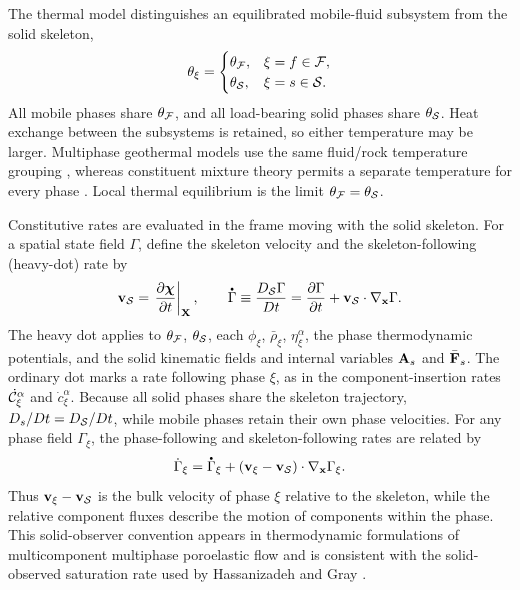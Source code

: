 The thermal model distinguishes an equilibrated mobile-fluid subsystem from
the solid skeleton,
%
\begin{equation}
	\theta_\xi
	=
	\begin{cases}
		\theta_{\mathcal{F}}, & \xi=f\in\mathcal{F},  \\
		\theta_{\mathcal{S}}, & \xi=s\in\mathcal{S} .
	\end{cases}
	\label{eq:MC_two_temperature_specialization}
\end{equation}
%
All mobile phases share \(\theta_{\mathcal{F}}\), and all load-bearing solid phases
share \(\theta_{\mathcal{S}}\).  Heat exchange between the subsystems is retained,
so either temperature may be larger.  Multiphase geothermal models use the
same fluid/rock temperature grouping \cite{faraz2021boiling}, whereas
constituent mixture theory permits a separate temperature for every phase
\cite{drumheller2000,hanyga2004thermal}.  Local thermal equilibrium is the
limit \(\theta_{\mathcal{F}}=\theta_{\mathcal{S}}\).

Constitutive rates are evaluated in the frame moving with the solid skeleton.
For a spatial state field \(\Gamma\), define the skeleton velocity and the
skeleton-following (heavy-dot) rate by
%
\begin{equation}
	\mbf v_{\mc S}
	=
	\left.
	\frac{\partial\bs\chi}{\partial t}
	\right\vert_{\mbf X},
	\qquad
	\phasedot\Gamma
	\equiv
	\frac{D_{\mc S}\Gamma}{Dt}
	=
	\frac{\partial\Gamma}{\partial t}
	+
	\mbf v_{\mc S}\cdot\nabla_{\mbf x}\Gamma .
	\label{eq:MC_skeleton_rate_convention}
\end{equation}
%
The heavy dot applies to \(\theta_{\mathcal{F}}\), \(\theta_{\mathcal{S}}\), each
\(\phi_\xi\), \(\bar\rho_\xi\), \(\eta_\xi^\alpha\), the phase thermodynamic
potentials, and the solid kinematic fields and internal variables \(\mathbf{A}_s\)
and \(\bar{\mathbf{F}}_s\).  The ordinary dot marks a rate following phase
\(\xi\), as in the component-insertion rates \(\dot{\mathcal{C}}_\xi^\alpha\) and
\(\dot c_\xi^\alpha\).  Because all solid phases share the skeleton trajectory,
\(D_s/Dt=D_{\mathcal{S}}/Dt\), while mobile phases retain their own phase velocities.
For any phase field \(\Gamma_\xi\), the phase-following and skeleton-following
rates are related by
%
\begin{equation}
	\dot{\Gamma}_\xi
	=
	\phasedot\Gamma_\xi
	+
	\left(
	\mbf v_\xi-\mbf v_{\mc S}
	\right)\cdot\nabla_{\mbf x}\Gamma_\xi .
	\label{eq:MC_phase_skeleton_transport_identity}
\end{equation}
%
Thus \(\mathbf{v}_\xi-\mathbf{v}_{\mathcal{S}}\) is the bulk velocity of phase \(\xi\)
relative to the skeleton, while the relative component fluxes describe the
motion of components within the phase.  This solid-observer convention appears
in thermodynamic formulations of multicomponent multiphase poroelastic flow
\cite[eq.~(2)]{seguin2019multicomponent} and is consistent with the
solid-observed saturation rate used by Hassanizadeh and Gray
\cite[eq.~(35)]{hassanizadeh1993thermodynamic}.

